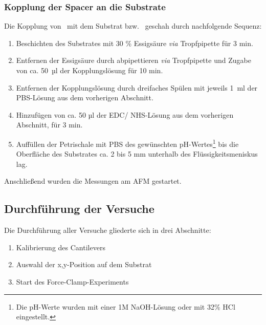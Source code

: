 \subsubsection{Kopplung der Spacer an die Substrate}
\label{subsubsec:kopplung_der_spacer_an_die_substrate}

Die Kopplung von \spacer~mit dem Substrat bzw. \spitze~geschah durch nachfolgende Sequenz:

\begin{enumerate}
	\renewcommand\labelenumi{\bfseries\theenumi.}
	
	\item Beschichten des Substrates mit 30 \% Essigsäure \textit{via} Tropfpipette für 3 min.
	\item Entfernen der Essigsäure durch abpipettieren \textit{via} Tropfpipette und Zugabe von ca. 50~µl der Kopplungslösung für 10 min.
	\item Entfernen der Kopplungslösung durch dreifaches Spülen mit jeweils 1~ml der \ac{PBS}-Lösung aus dem vorherigen Abschnitt.
	\item Hinzufügen von ca. 50 µl der \ac{EDC}/ \ac{NHS}-Lösung aus dem vorherigen Abschnitt,  für 3 min.
	\item Auffüllen der Petrischale mit \ac{PBS} des gewünschten pH-Wertes\footnote{Die pH-Werte wurden mit einer 1M NaOH-Lösung oder mit 32\% \ac{HCl} eingestellt.} bis die Oberfläche des Substrates ca. 2 bis 5 mm unterhalb des Flüssigkeitsmeniskus lag.
	
\end{enumerate}

Anschließend wurden die Messungen am \ac{AFM} gestartet.

\subsection{Durchführung der Versuche}
\label{subsec:durchführung_der_versuche}

Die Durchführung aller Versuche gliederte sich in drei Abschnitte:

\begin{enumerate}
	\renewcommand\labelenumi{\bfseries\theenumi.}
	
	\item Kalibrierung des Cantilevers
	\item Auswahl der x,y-Position auf dem Substrat 
	\item Start des Force-Clamp-Experiments
	
\end{enumerate}

